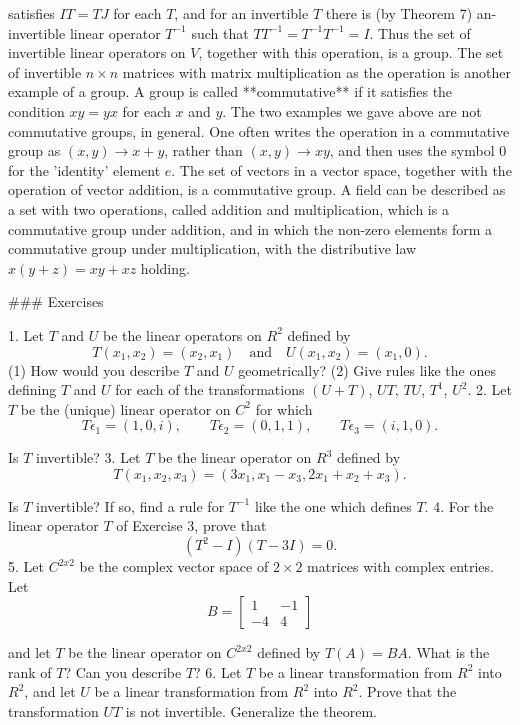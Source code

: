 satisfies \(IT=TJ\) for each \(T\), and for an invertible \(T\) there is (by Theorem 7) an-invertible linear operator \(T^{-1}\) such that \(TT^{-1}=T^{-1}T^{-1}=I\). Thus the set of invertible linear operators on \(V\), together with this operation, is a group. The set of invertible \(n\times n\) matrices with matrix multiplication as the operation is another example of a group. A group is called **commutative** if it satisfies the condition \(xy=yx\) for each \(x\) and \(y\). The two examples we gave above are not commutative groups, in general. One often writes the operation in a commutative group as \((x,y)\to x+y\), rather than \((x,y)\to xy\), and then uses the symbol \(0\) for the 'identity' element \(e\). The set of vectors in a vector space, together with the operation of vector addition, is a commutative group. A field can be described as a set with two operations, called addition and multiplication, which is a commutative group under addition, and in which the non-zero elements form a commutative group under multiplication, with the distributive law \(x(y+z)=xy+xz\) holding.

### Exercises

1. Let \(T\) and \(U\) be the linear operators on \(R^{2}\) defined by \[T(x_{1},x_{2})=(x_{2},x_{1})\quad\text{and}\quad U(x_{1},x_{2})=(x_{1},0).\] (1) How would you describe \(T\) and \(U\) geometrically? (2) Give rules like the ones defining \(T\) and \(U\) for each of the transformations \((U+T)\), \(UT\), \(TU\), \(T^{1}\), \(U^{2}\).
2. Let \(T\) be the (unique) linear operator on \(C^{2}\) for which \[T\epsilon_{1}=(1,0,i),\qquad T\epsilon_{2}=(0,1,1),\qquad T\epsilon_{3}=(i,1,0).\]

Is \(T\) invertible?
3. Let \(T\) be the linear operator on \(R^{3}\) defined by \[T(x_{1},x_{2},x_{3})=(3x_{1},x_{1}-x_{3},2x_{1}+x_{2}+x_{3}).\]

Is \(T\) invertible? If so, find a rule for \(T^{-1}\) like the one which defines \(T\).
4. For the linear operator \(T\) of Exercise 3, prove that \[(T^{2}-I)(T-3I)=0.\]
5. Let \(C^{2x2}\) be the complex vector space of \(2\times 2\) matrices with complex entries. Let \[B=\left[\begin{array}{cc}1&-1\\ -4&4\end{array}\right]\]

and let \(T\) be the linear operator on \(C^{2x2}\) defined by \(T(A)=BA\). What is the rank of \(T\)? Can you describe \(T\)?
6. Let \(T\) be a linear transformation from \(R^{2}\) into \(R^{2}\), and let \(U\) be a linear transformation from \(R^{2}\) into \(R^{2}\). Prove that the transformation \(UT\) is not invertible. Generalize the theorem.

 